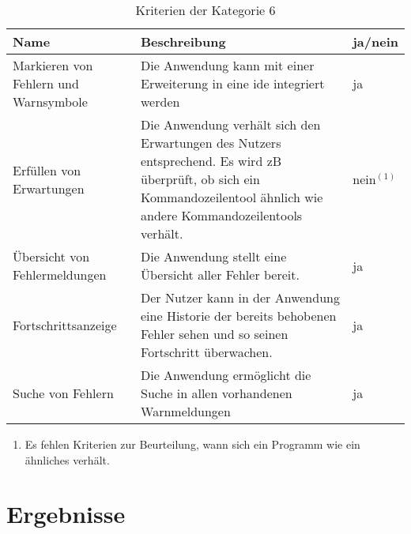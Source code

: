 \begin{table}[t]
    \centering
    \begin{tabularx}{\columnwidth}{XXl}
        \toprule
        \textbf{Name}                         & \textbf{Beschreibung}                                                                                                                                                          & \textbf{ja/nein} \\
        \midrule
        Markieren von Fehlern und Warnsymbole & Die Anwendung kann mit einer Erweiterung in eine \ac{ide} integriert werden                                                                                                    & ja               \\
        \midrule
        Erfüllen von Erwartungen              & Die Anwendung verhält sich den Erwartungen des Nutzers entsprechend. Es wird \ac{zB} überprüft, ob sich ein Kommandozeilentool ähnlich wie andere Kommandozeilentools verhält. & nein$^{(1)}$     \\
        \midrule
        Übersicht von Fehlermeldungen         & Die Anwendung stellt eine Übersicht aller Fehler bereit.                                                                                                                       & ja               \\
        \midrule
        Fortschrittsanzeige                   & Der Nutzer kann in der Anwendung eine Historie der bereits behobenen Fehler sehen und so seinen Fortschritt überwachen.                                                        & ja               \\
        \midrule
        Suche von Fehlern                     & Die Anwendung ermöglicht die Suche in allen vorhandenen Warnmeldungen                                                                                                          & ja               \\
        \bottomrule
    \end{tabularx}
    \caption{Kriterien der Kategorie 6}
    \label{tbl:criteria-category-6}
\end{table}

\FloatBarrier

\begin{enumerate}[label= (\arabic*)]
    \item Es fehlen Kriterien zur Beurteilung, wann sich ein Programm wie ein ähnliches verhält.
\end{enumerate}

\section{Ergebnisse}

